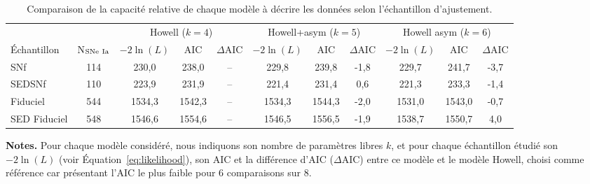 \documentclass[../main/main.tex]{subfiles}
\begin{document}
\begin{table}[h]
    \centerfloat
    \begin{threeparttable}
        \caption[Comparaison de la capacité relative de chaque modèle à décrire
        les données selon l'échantillon d'ajustement]{Comparaison de la
            capacité relative de chaque modèle à décrire les données selon
        l'échantillon d'ajustement.}
        \label{tab:modelcomp}
        \begin{tabular}{lcccccccccc}
            \toprule &
            & \multicolumn{3}{c}{Howell ($k=4$)}
            & \multicolumn{3}{c}{Howell+asym ($k=5$)}
            & \multicolumn{3}{c}{Howell asym ($k=6$)} \\
            \cmidrule(lr){3-5}\cmidrule(lr){6-8}\cmidrule(lr){9-11}
            Échantillon & N$_{\rm SNe~Ia}$ &
            $-2\ln(L)$ & AIC & $\Delta$AIC &
            $-2\ln(L)$ & AIC & $\Delta$AIC &
            $-2\ln(L)$ & AIC & $\Delta$AIC\\[0.2em]
            \midrule
            SNf & 114 &
            230,0 & 238,0 & -- &
            229,8 & 239,8 & -1,8 &
            229,7 & 241,7 & -3,7 \\
            SEDSNf & 110 &
            223,9 & 231,9 & -- &
            221,4 & 231,4 & 0,6 &
            221,3 & 233,3 & -1,4 \\
            Fiduciel & 544 &
            1534,3 & 1542,3 & -- &
            1534,3 & 1544,3 & -2,0 &
            1531,0 & 1543,0 & -0,7 \\
            SED Fiduciel & 548 &
            1546,6 & 1554,6 & -- &
            1546,5 & 1556,5 & -1,9 &
            1538,7 & 1550,7 & 4,0 \\
            \bottomrule
        \end{tabular}
        \begin{tablenotes}[flushleft]
            \item\small \textbf{\hspace{-3.2pt}Notes.} Pour chaque modèle
                considéré, nous indiquons son nombre
                de paramètres libres $k$, et pour chaque échantillon étudié son
                $-2\ln(L)$ (voir Équation~\ref{eq:likelihood}), son AIC et la
                différence d'AIC ($\Delta$AIC) entre ce modèle et le modèle
                Howell, choisi comme référence car présentant l'AIC le plus
                faible pour 6 comparaisons sur 8.
        \end{tablenotes}
    \end{threeparttable}
\end{table}
\end{document}
